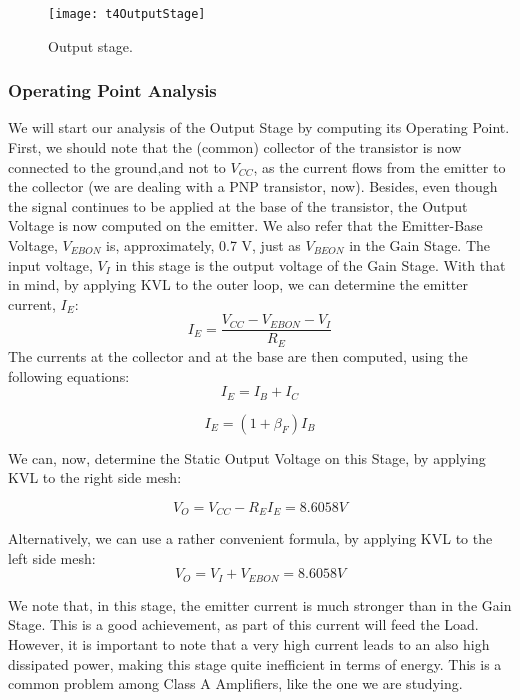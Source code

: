 \FloatBarrier
\begin{figure}[h] \centering
	\texttt{[image: t4OutputStage]}
	\caption{Output stage.}
	\label{fig:OutputStage}
\end{figure}
\FloatBarrier

\subsubsection{Operating Point Analysis}

We will start our analysis of the Output Stage by computing its Operating Point. First, we should note that the (common) collector of the transistor is now connected to the ground,and not to $V_{CC}$, as the current flows from the emitter to the collector (we are dealing with a PNP transistor, now). Besides, even though the signal continues to be applied at the base of the transistor, the Output Voltage is now computed on the emitter. We also refer that the Emitter-Base Voltage, $V_{EBON}$ is, approximately, 0.7 V, just as $V_{BEON}$ in the Gain Stage. The input voltage, $V_I$ in this stage is the output voltage of the Gain Stage.
With that in mind, by applying KVL to the outer loop, we can determine the emitter current, $I_E$:
\begin{equation}
	I_E = \frac{V_{CC} - V_{EBON} - V_I}{R_E}
	\label{eq:IeOS}
\end{equation}
The currents at the collector and at the base are then computed, using the following equations:
\begin{equation}
	I_E = I_B + I_C
	\label{eq:IeSum}
\end{equation}

\begin{equation}
	I_E = (1 + \beta_F) I_B
	\label{eq:IeBf}
\end{equation}

We can, now, determine the Static Output Voltage on this Stage, by applying KVL to the right side mesh:

\begin{equation}
	V_O = V_{CC} - R_E I_E = 8.6058V
	\label{eq:VoOS1}
\end{equation}

Alternatively, we can use a rather convenient formula, by applying KVL to the left side mesh:
\begin{equation}
	V_O = V_I + V_{EBON} = 8.6058 V
	\label{eq:VoOS2}
\end{equation}


We note that, in this stage, the emitter current is much stronger than in the Gain Stage. This is a good achievement, as part of this current will feed the Load. However, it is important to note that a very high current leads to an also high dissipated power, making this stage quite inefficient in terms of energy. This is a common problem among Class A Amplifiers, like the one we are studying.

